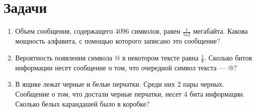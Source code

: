 \documentclass[12pt]{article}
\begin{document}
\section{Задачи}

\begin{enumerate}
\item Объем сообщения, содержащего $4096$ символов, равен $\frac{1}{512}$ мегабайта. Какова мощность алфавита, с помощью которого записано это сообщение?
\item Вероятность появления символа @ в некотором тексте равна $\frac{1}{8}$. Сколько битов информации несет сообщение о том, что очередной символ текста --- @?
\item В ящике лежат черные и белые перчатки. Среди них 2 пары черных. Сообщение о том, что достали черные перчатки, несет 4 бита информации. Сколько белых карандашей было в коробке?
\end{enumerate}
\end{document}
